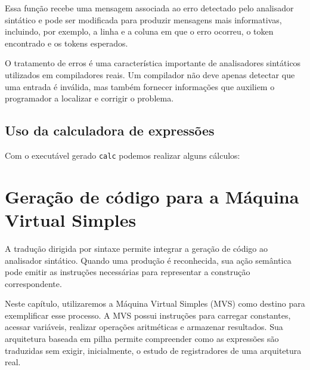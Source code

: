\documentclass[
  brazilian,
  letterpaper,
]{book}
\newenvironment{Shaded}{\begin{snugshade}}{\end{snugshade}}
\newcommand{\DecValTok}[1]{\textcolor[rgb]{0.68,0.00,0.00}{#1}}
\newcommand{\NormalTok}[1]{\textcolor[rgb]{0.00,0.23,0.31}{#1}}
\newcommand{\OperatorTok}[1]{\textcolor[rgb]{0.37,0.37,0.37}{#1}}
\theoremstyle{plain}
\theoremstyle{definition}
\theoremstyle{remark}
\begin{document}
Essa função recebe uma mensagem associada ao erro detectado pelo
analisador sintático e pode ser modificada para produzir mensagens mais
informativas, incluindo, por exemplo, a linha e a coluna em que o erro
ocorreu, o token encontrado e os tokens esperados.

O tratamento de erros é uma característica importante de analisadores
sintáticos utilizados em compiladores reais. Um compilador não deve
apenas detectar que uma entrada é inválida, mas também fornecer
informações que auxiliem o programador a localizar e corrigir o
problema.

\subsection{Uso da calculadora de
expressões}\label{uso-da-calculadora-de-expressuxf5es}

Com o executável gerado \texttt{calc} podemos realizar alguns cálculos:

\begin{Shaded}
\end{Shaded}

\section{Geração de código para a Máquina Virtual
Simples}\label{gerauxe7uxe3o-de-cuxf3digo-para-a-muxe1quina-virtual-simples}

A tradução dirigida por sintaxe permite integrar a geração de código ao
analisador sintático. Quando uma produção é reconhecida, sua ação
semântica pode emitir as instruções necessárias para representar a
construção correspondente.

Neste capítulo, utilizaremos a Máquina Virtual Simples (MVS) como
destino para exemplificar esse processo. A MVS possui instruções para
carregar constantes, acessar variáveis, realizar operações aritméticas e
armazenar resultados. Sua arquitetura baseada em pilha permite
compreender como as expressões são traduzidas sem exigir, inicialmente,
o estudo de registradores de uma arquitetura real.
\end{document}
